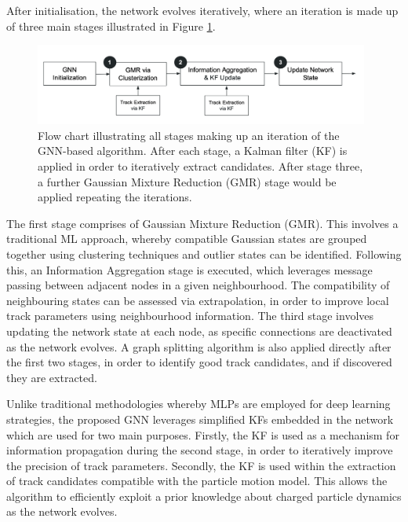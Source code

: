 After initialisation, the network evolves iteratively, where an iteration is made up of three main stages illustrated in Figure \ref{fig:flowchart}. 

\begin{figure}[htbp]
    \centering
    \includegraphics[width=0.98\textwidth]{images/5-gnn-algorithm/gnn-workflow.png}
    \caption{Flow chart illustrating all stages making up an iteration of the GNN-based algorithm. After each stage, a Kalman filter (KF) is applied in order to iteratively extract candidates. After stage three, a further Gaussian Mixture Reduction (GMR) stage would be applied repeating the iterations.}
    \label{fig:flowchart}%
\end{figure}


The first stage comprises of Gaussian Mixture Reduction (GMR). This involves a traditional ML approach, whereby compatible Gaussian states are grouped together using clustering techniques and outlier states can be identified. Following this, an Information Aggregation stage is executed, which leverages message passing between adjacent nodes in a given neighbourhood. The compatibility of neighbouring states can be assessed via extrapolation, in order to improve local track parameters using neighbourhood information. The third stage involves updating the network state at each node, as specific connections are deactivated as the network evolves. A graph splitting algorithm is also applied directly after the first two stages, in order to identify good track candidates, and if discovered they are extracted. 

Unlike traditional methodologies whereby MLPs are employed for deep learning strategies, the proposed GNN leverages simplified KFs embedded in the network which are used for two main purposes. Firstly, the KF is used as a mechanism for information propagation during the second stage, in order to iteratively improve the precision of track parameters. Secondly, the KF is used within the extraction of track candidates compatible with the particle motion model. This allows the algorithm to efficiently exploit a prior knowledge about charged particle dynamics as the network evolves.

